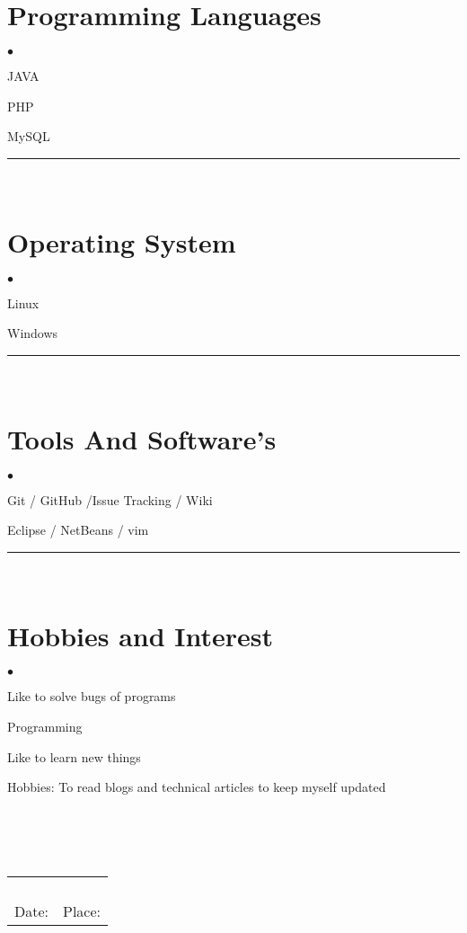 \documentclass[letterpaper,margin,line]{RES}
\newenvironment{list2}{
  \begin{list}{$\bullet$}{%
      \setlength{\itemsep}{1pt}
      \setlength{\parsep}{0in} \setlength{\parskip}{0in}
      \setlength{\topsep}{0in} \setlength{\partopsep}{0in} 
      \setlength{\leftmargin}{0.2in}}}{\end{list}}
\def\mmmyline{\rule{\textwidth}{1pt}\\}
\begin{document}
\begin{resume}
\section{\sc Programming Languages }
\begin{list2}		 
		 \item	JAVA
		 	\item	PHP
		 	\item MySQL
\end{list2}     

\mmmyline

\section{\sc Operating System }
\begin{list2}		 
		 \item	Linux
		 	\item	Windows
\end{list2}     

\mmmyline

\section{\sc Tools And Software's }
\begin{list2}		 
		 \item	Git / GitHub /Issue Tracking / Wiki
		 	\item	Eclipse / NetBeans / vim
\end{list2}     

\mmmyline

\section{\sc Hobbies and Interest }
\begin{list2}		 
		 \item	Like to solve bugs of programs
		 	\item	Programming
		 	\item	Like to learn new things
		 	\item	Hobbies: To read blogs and technical articles to keep myself updated
\end{list2}     

\\
\\

\\

\begin{tabular}{@{}p{4in}p{3in}}
\\
\\
\\
\\
\\


Date:   & Place: 
\end{tabular}



\end{resume}
\end{document}

